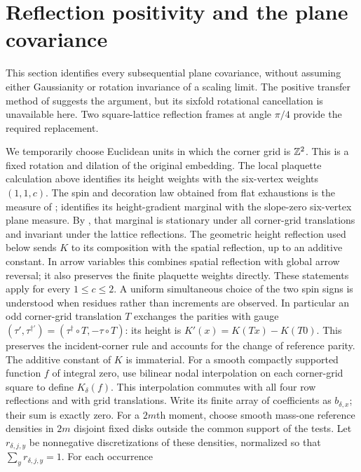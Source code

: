 \section{Reflection positivity and the plane covariance}
\label{sec:spectral}

This section identifies every subsequential plane covariance, without assuming
either Gaussianity or rotation invariance of a scaling limit. The positive
transfer method of \cite[Section~5]{Triangular} suggests the argument, but its
sixfold rotational cancellation is unavailable here. Two square-lattice
reflection frames at angle $\pi/4$ provide the required replacement.

We temporarily choose Euclidean units in which the corner grid is $\mathbb Z^2$.
This is a fixed rotation and dilation of the original embedding. The local
plaquette calculation above identifies its height weights with the
six-vertex weights $(1,1,c)$. The spin and decoration law obtained from flat
exhaustions is the measure of \cite[Theorem~17.1]{DKLM2026};
\cite[Lemma~18.7(iii)]{DKLM2026} identifies its height-gradient marginal
with the slope-zero six-vertex plane measure. By
\cite[Theorem~2.2]{DKLM2026}, that marginal is stationary under all
corner-grid translations and invariant under the lattice reflections.
The geometric height reflection used below sends $K$ to its composition
with the spatial reflection, up to an additive constant. In arrow variables
this combines spatial reflection with global arrow reversal; it also
preserves the finite plaquette weights directly.
These statements apply for every $1\le c\le2$. A uniform simultaneous
choice of the two spin signs is understood when residues rather than
increments are observed. In particular an odd corner-grid translation $T$
exchanges the parities with gauge
$(\tau',\tau^{\dagger\prime})=(\tau^\dagger\circ T,-\tau\circ T)$:
its height is $K'(x)=K(Tx)-K(T0)$. This preserves the incident-corner rule
and accounts for the change of reference parity.
The additive constant of $K$ is immaterial. For a smooth compactly supported
function $f$ of integral zero, use bilinear nodal interpolation on each
corner-grid square to define $K_\delta(f)$. This interpolation commutes with
all four row reflections and with grid translations.
Write its finite array of coefficients as $b_{\delta,x}$; their sum is
exactly zero. For a $2m$th moment, choose smooth mass-one reference
densities in $2m$ disjoint fixed disks outside the common support of the
tests. Let $r_{\delta,j,y}$ be nonnegative discretizations of these
densities, normalized so that $\sum_y r_{\delta,j,y}=1$. For each occurrence
